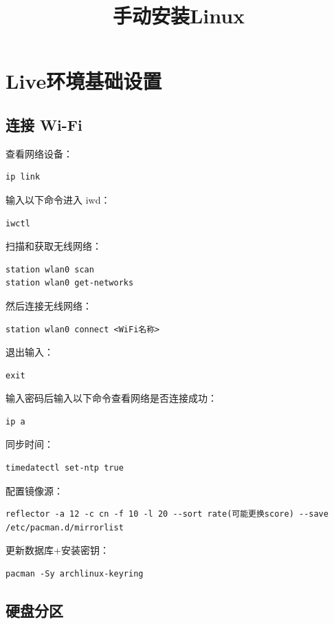 \documentclass[a4paper, twocolumn, twoside, 10pt]{article}
\title{\heiti 手动安装Linux}
\begin{document}
\section{Live环境基础设置}

\subsection{连接 Wi-Fi}

查看网络设备：
\begin{lstlisting}
ip link
\end{lstlisting}

输入以下命令进入 iwd：
\begin{lstlisting}
iwctl
\end{lstlisting}

扫描和获取无线网络：
\begin{lstlisting}
station wlan0 scan
station wlan0 get-networks
\end{lstlisting}

然后连接无线网络：
\begin{lstlisting}
station wlan0 connect <WiFi名称>
\end{lstlisting}

退出输入：
\begin{lstlisting}
exit
\end{lstlisting}

输入密码后输入以下命令查看网络是否连接成功：
\begin{lstlisting}
ip a
\end{lstlisting}


同步时间：
\begin{lstlisting}
timedatectl set-ntp true
\end{lstlisting}

配置镜像源：
\begin{lstlisting}
reflector -a 12 -c cn -f 10 -l 20 --sort rate(可能更换score) --save /etc/pacman.d/mirrorlist
\end{lstlisting}

更新数据库+安装密钥：
\begin{lstlisting}
pacman -Sy archlinux-keyring
\end{lstlisting}

\subsection{硬盘分区}
\end{document}
